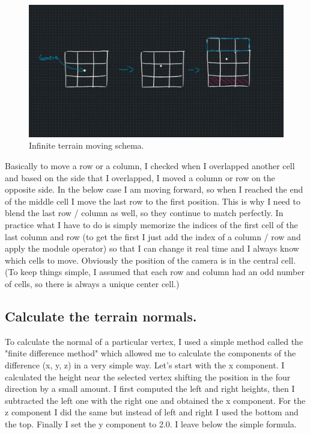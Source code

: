 \begin{figure}[hbt!]
	\centering
	\includegraphics[width= 1
	\textwidth]{images/infiniteTerrainSchema.jpg}
	\caption{Infinite terrain moving schema.}
\end{figure} 

\noindent
Basically to move a row or a column, I checked when I overlapped another cell and based on the side that I overlapped, I moved a column or row on the opposite side. In the below case I am moving forward, so when I reached the end of the middle cell I move the last row to the first position. This is why I need to blend the last row / column as well, so they continue to match perfectly.
In practice what I have to do is simply memorize the indices of the first cell of the last column and row (to get the first I just add the index of a column / row and apply the module operator) so that I can change it real time and I always know which cells to move.
Obviously the position of the camera is in the central cell. (To keep things simple, I assumed that each row and column had an odd number of cells, so there is always a unique center cell.)

\subsection{Calculate the terrain normals.}
To calculate the normal of a particular vertex, I used a simple method called the "finite difference method" which allowed me to calculate the components of the difference (x, y, z) in a very simple way. Let's start with the x component. I calculated the height near the selected vertex shifting the position in the four direction by a small amount. I first computed the left and right heights, then I subtracted the left one with the right one and obtained the x component. For the z component I did the same but instead of left and right I used the bottom and the top. Finally I set the y component to 2.0. I leave below the simple formula.

